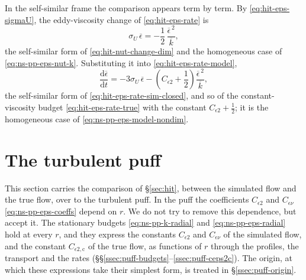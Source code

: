 \documentclass{article}
\begin{document}
In the self-similar frame the comparison appears term by term. By
\eqref{eq:hit-eps-sigmaU}, the eddy-viscosity change of \eqref{eq:hit-eps-rate}
is
\begin{equation}\label{eq:hit-nut-change}
  \sigma_U\, \overline{\epsilon}
  = -\frac{1}{2}\, \frac{\overline{\epsilon}^{\,2}}{\overline{k}} ,
\end{equation}
the self-similar form of \eqref{eq:hit-nut-change-dim} and the homogeneous
case of \eqref{eq:ns-pp-eps-nut-k}. Substituting it into
\eqref{eq:hit-eps-rate-model},
\begin{equation}\label{eq:hit-eps-rate-model-true}
  \frac{\mathrm{d} \overline{\epsilon}}{\mathrm{d} t}
  = -3\sigma_U\, \overline{\epsilon}
  - \left( C_{\epsilon 2} + \frac{1}{2} \right) \frac{\overline{\epsilon}^{\,2}}{\overline{k}} ,
\end{equation}
the self-similar form of \eqref{eq:hit-eps-rate-sim-closed}, and so of the
constant-viscosity budget \eqref{eq:hit-eps-rate-true} with the constant
$C_{\epsilon 2} + \tfrac12$; it is the homogeneous case of
\eqref{eq:ns-pp-eps-model-nondim}.
\par

\section{The turbulent puff}\label{sec:puff}
This section carries the comparison of \S\ref{sec:hit}, between the simulated
flow and the true flow, over to the turbulent puff. In the puff the
coefficients $C_{\epsilon 2}$ and $C_{\epsilon\nu}$
\eqref{eq:ns-pp-eps-coeffs} depend on $r$. We do not try to remove this
dependence, but accept it. The stationary budgets \eqref{eq:ns-pp-k-radial}
and \eqref{eq:ns-pp-eps-radial} hold at every $r$, and they express the
constants $C_{\epsilon 2}$ and $C_{\epsilon\nu}$ of the simulated flow, and
the constant $C_{\epsilon 2,\mathrm{c}}$ of the true flow, as functions of $r$
through the profiles, the transport and the rates
(\S\S\ref{ssec:puff-budgets}--\ref{ssec:puff-ceps2c}). The origin, at which
these expressions take their simplest form, is treated in
\S\ref{ssec:puff-origin}.
\end{document}
